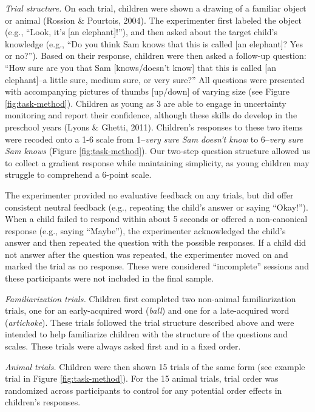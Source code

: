 \documentclass[10pt, letterpaper]{article}
\begin{document}
\emph{Trial structure.} On each trial, children were shown a drawing of
a familiar object or animal (Rossion \& Pourtois, 2004). The
experimenter first labeled the object (e.g., ``Look, it's {[}an
elephant{]}!''), and then asked about the target child's knowledge
(e.g., ``Do you think Sam knows that this is called {[}an elephant{]}?
Yes or no?''). Based on their response, children were then asked a
follow-up question: ``How sure are you that Sam {[}knows/doesn't know{]}
that this is called {[}an elephant{]}--a little sure, medium sure, or
very sure?'' All questions were presented with accompanying pictures of
thumbs {[}up/down{]} of varying size (see Figure \ref{fig:task-method}).
Children as young as 3 are able to engage in uncertainty monitoring and
report their confidence, although these skills do develop in the
preschool years (Lyons \& Ghetti, 2011). Children's responses to these
two items were recoded onto a 1-6 scale from 1--\emph{very sure Sam
doesn't know} to 6--\emph{very sure Sam knows} (Figure
\ref{fig:task-method}). Our two-step question structure allowed us to
collect a gradient response while maintaining simplicity, as young
children may struggle to comprehend a 6-point scale.

The experimenter provided no evaluative feedback on any trials, but did
offer consistent neutral feedback (e.g., repeating the child's answer or
saying ``Okay!''). When a child failed to respond within about 5 seconds
or offered a non-canonical response (e.g., saying ``Maybe''), the
experimenter acknowledged the child's answer and then repeated the
question with the possible responses. If a child did not answer after
the question was repeated, the experimenter moved on and marked the
trial as no response. These were considered ``incomplete'' sessions and
these participants were not included in the final sample.

\emph{Familiarization trials.} Children first completed two non-animal
familiarization trials, one for an early-acquired word (\emph{ball}) and
one for a late-acquired word (\emph{artichoke}). These trials followed
the trial structure described above and were intended to help
familiarize children with the structure of the questions and scales.
These trials were always asked first and in a fixed order.

\emph{Animal trials.} Children were then shown 15 trials of the same
form (see example trial in Figure \ref{fig:task-method}). For the 15
animal trials, trial order was randomized across participants to control
for any potential order effects in children's responses.
\end{document}
